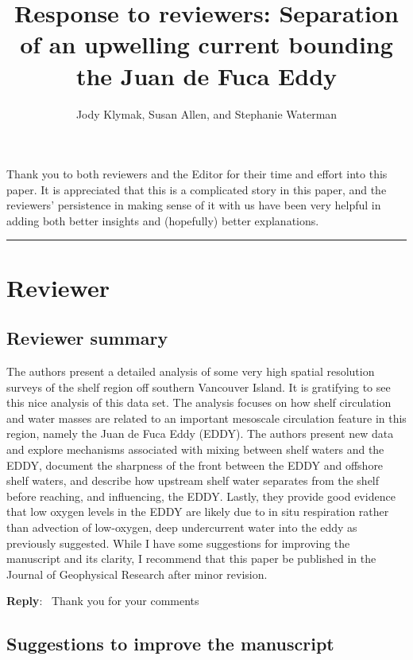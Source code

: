 \documentclass[11pt]{article}
\title{Response to reviewers: Separation of an upwelling current bounding the Juan de Fuca Eddy}
\author{Jody Klymak, Susan Allen, and Stephanie Waterman}
\newcounter{reviewer}
\newcounter{point}[reviewer]
\newcommand{\reviewersection}{\stepcounter{reviewer} \bigskip \hrule
                  \section*{Reviewer \thereviewer}}
\newenvironment{reply}
   {\medskip \noindent \begin{sf}\textbf{Reply}:\  }
   {\medskip \end{sf}}
\begin{document}
\lstset{language=TeX}

\maketitle

\section*{}
Thank you to both reviewers and the Editor for their time and effort into this paper.  It is appreciated that this is a complicated story in this paper, and the reviewers' persistence in making sense of it with us have been very helpful in adding both better insights and (hopefully) better explanations.

\reviewersection

\subsection*{Reviewer summary}
The authors present a detailed analysis of some very high spatial resolution surveys of the shelf region off southern Vancouver Island. It is gratifying to see this nice analysis of this data set. The analysis focuses on how shelf circulation and water masses are related to an important mesoscale circulation feature in this region, namely the Juan de Fuca Eddy (EDDY). The authors present new data and explore mechanisms associated with mixing between shelf waters and the EDDY, document the sharpness of the front between the EDDY and offshore shelf waters, and describe how upstream shelf water separates from the shelf before reaching, and influencing, the EDDY. Lastly, they provide good evidence that low oxygen levels in the EDDY are likely due to in situ respiration rather than advection of low-oxygen, deep undercurrent water into the eddy as previously suggested. While I have some suggestions for improving the manuscript and its clarity, I recommend that this paper be published in the Journal of Geophysical Research after minor revision.

\begin{reply}
    Thank you for your comments
\end{reply}

\subsection*{Suggestions to improve the manuscript}
\end{document}
